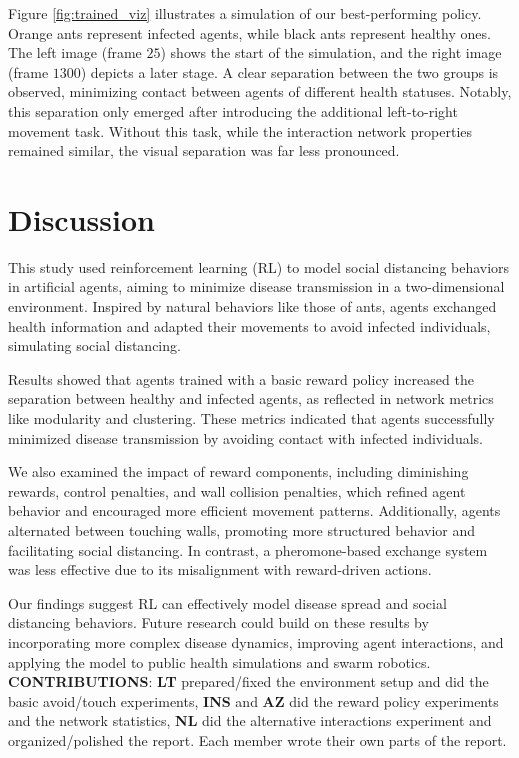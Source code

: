 \documentclass[9pt]{IEEEtran}
\begin{document}
Figure \ref{fig:trained_viz} illustrates a simulation of our best-performing policy. Orange ants represent infected agents, while black ants represent healthy ones. The left image (frame $25$) shows the start of the simulation, and the right image (frame $1300$) depicts a later stage. A clear separation between the two groups is observed, minimizing contact between agents of different health statuses. Notably, this separation only emerged after introducing the additional left-to-right movement task. Without this task, while the interaction network properties remained similar, the visual separation was far less pronounced.

\section{Discussion}

This study used reinforcement learning (RL) to model social distancing behaviors in artificial agents, aiming to minimize disease transmission in a two-dimensional environment. Inspired by natural behaviors like those of ants, agents exchanged health information and adapted their movements to avoid infected individuals, simulating social distancing.

Results showed that agents trained with a basic reward policy increased the separation between healthy and infected agents, as reflected in network metrics like modularity and clustering. These metrics indicated that agents successfully minimized disease transmission by avoiding contact with infected individuals.

We also examined the impact of reward components, including diminishing rewards, control penalties, and wall collision penalties, which refined agent behavior and encouraged more efficient movement patterns. Additionally, agents alternated between touching walls, promoting more structured behavior and facilitating social distancing. In contrast, a pheromone-based exchange system was less effective due to its misalignment with reward-driven actions.

Our findings suggest RL can effectively model disease spread and social distancing behaviors. Future research could build on these results by incorporating more complex disease dynamics, improving agent interactions, and applying the model to public health simulations and swarm robotics.
\\

\noindent\textbf{CONTRIBUTIONS}: \textbf{LT} prepared/fixed the environment setup and did the basic avoid/touch experiments, \textbf{INS} and \textbf{AZ} did the reward policy experiments and the network statistics, \textbf{NL} did the alternative interactions experiment and organized/polished the report. Each member wrote their own parts of the report.

\printbibliography
\end{document}
